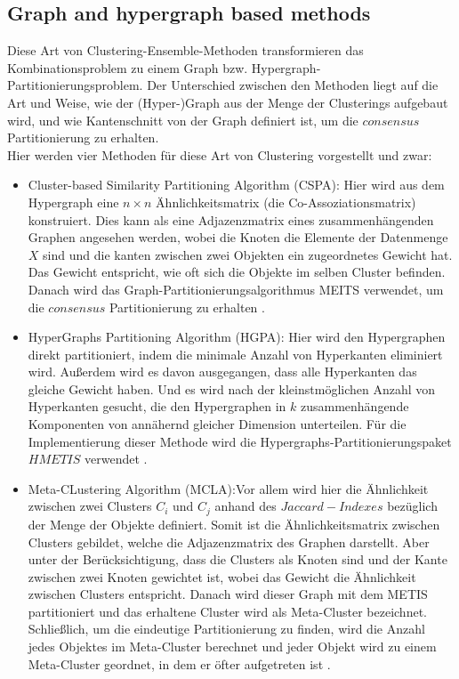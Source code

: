 \documentclass[runningheads]{llncs}
\begin{document}
\subsection{Graph and hypergraph based methods}
Diese Art von Clustering-Ensemble-Methoden transformieren das Kombinationsproblem zu einem Graph bzw. Hypergraph-Partitionierungsproblem. Der Unterschied zwischen den Methoden liegt auf die Art und Weise, wie der (Hyper-)Graph aus der Menge der Clusterings aufgebaut wird, und wie Kantenschnitt von der Graph definiert ist, um die $consensus$ Partitionierung zu erhalten.\\
Hier werden vier Methoden für diese Art von Clustering vorgestellt und zwar: 
\begin{itemize}
	\item Cluster-based Similarity Partitioning Algorithm (CSPA): Hier wird aus dem Hypergraph eine $n \times n$ Ähnlichkeitsmatrix (die Co-Assoziationsmatrix) konstruiert. Dies kann als eine Adjazenzmatrix eines zusammenhängenden Graphen angesehen werden, wobei die Knoten die Elemente der Datenmenge $X$ sind und die kanten zwischen zwei Objekten ein zugeordnetes Gewicht hat. Das Gewicht entspricht, wie oft sich die Objekte im selben Cluster befinden. Danach wird das Graph-Partitionierungsalgorithmus MEITS verwendet, um die $consensus$ Partitionierung zu erhalten \cite{vega2011survey}.\\[4pt]
	
	\item HyperGraphs Partitioning Algorithm (HGPA): Hier wird den Hypergraphen direkt partitioniert, indem die minimale Anzahl  von Hyperkanten eliminiert wird. Außerdem wird es davon ausgegangen, dass alle Hyperkanten das gleiche Gewicht haben. Und es wird nach der kleinstmöglichen Anzahl von Hyperkanten gesucht, die den Hypergraphen in $k$ zusammenhängende Komponenten von
	annähernd gleicher Dimension unterteilen. Für die Implementierung dieser Methode wird die Hypergraphs-Partitionierungspaket $HMETIS$ verwendet \cite{vega2011survey}.\\[4pt]
	
	\item  Meta-CLustering Algorithm (MCLA):Vor allem wird hier die Ähnlichkeit zwischen zwei Clusters $C_{i}$ und $C_{j}$ anhand des $Jaccard-Indexes$ bezüglich der Menge der Objekte definiert. Somit ist die Ähnlichkeitsmatrix zwischen Clusters gebildet, welche die Adjazenzmatrix des Graphen darstellt. Aber unter der Berücksichtigung, dass die Clusters als Knoten sind und der Kante zwischen zwei Knoten gewichtet ist, wobei das Gewicht die Ähnlichkeit zwischen Clusters entspricht. Danach wird dieser Graph mit dem METIS partitioniert und das erhaltene Cluster wird als Meta-Cluster bezeichnet.\\
	Schließlich, um die eindeutige Partitionierung zu finden, wird die Anzahl jedes Objektes im Meta-Cluster berechnet und jeder Objekt wird zu einem Meta-Cluster geordnet, in dem er öfter aufgetreten ist \cite{vega2011survey}.\\[4pt]
	      

\end{itemize}
\end{document}
